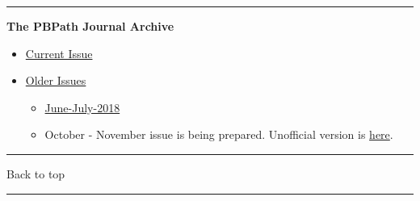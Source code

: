 \documentclass[]{article}
\begin{document}
\begin{center}\rule{0.5\linewidth}{\linethickness}\end{center}

\textbf{The PBPath Journal Archive}

\begin{itemize}
\item
  \href{http://pbpath.org/journal-watch/}{Current Issue}
\item
  \href{http://pbpath.org/journal-watch-archive/}{Older Issues}

  \begin{itemize}
  \item
    \href{http://pbpath.org/pbpath-journal-watch-june-july-2018/}{June-July-2018}
  \item
    October - November issue is being prepared. Unofficial version is
    \href{http://pbpath.org/journal-watch-upcoming-issue/}{here}.
  \end{itemize}
\end{itemize}

\begin{center}\rule{0.5\linewidth}{\linethickness}\end{center}

Back to top

\begin{center}\rule{0.5\linewidth}{\linethickness}\end{center}
\end{document}
